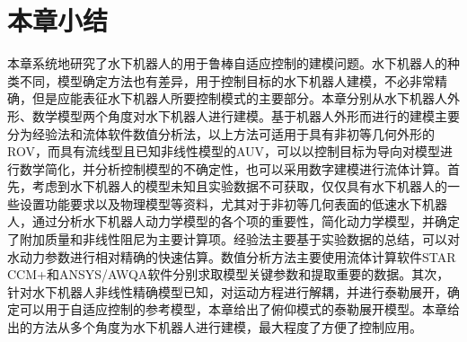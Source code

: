 \section{本章小结 }

本章系统地研究了水下机器人的用于鲁棒自适应控制的建模问题。水下机器人的种类不同，模型确定方法也有差异，用于控制目标的水下机器人建模，不必非常精确，但是应能表征水下机器人所要控制模式的主要部分。本章分别从水下机器人外形、数学模型两个角度对水下机器人进行建模。基于机器人外形而进行的建模主要分为经验法和流体软件数值分析法，以上方法可适用于具有非初等几何外形的ROV，而具有流线型且已知非线性模型的AUV，可以以控制目标为导向对模型进行数学简化，并分析控制模型的不确定性，也可以采用数字建模进行流体计算。首先，考虑到水下机器人的模型未知且实验数据不可获取，仅仅具有水下机器人的一些设置功能要求以及物理模型等资料，尤其对于非初等几何表面的低速水下机器人，通过分析水下机器人动力学模型的各个项的重要性，简化动力学模型，并确定了附加质量和非线性阻尼为主要计算项。经验法主要基于实验数据的总结，可以对水动力参数进行相对精确的快速估算。数值分析方法主要使用流体计算软件STAR CCM+和ANSYS/AWQA软件分别求取模型关键参数和提取重要的数据。其次，针对水下机器人非线性精确模型已知，对运动方程进行解耦，并进行泰勒展开，确定可以用于自适应控制的参考模型，本章给出了俯仰模式的泰勒展开模型。本章给出的方法从多个角度为水下机器人进行建模，最大程度了方便了控制应用。
